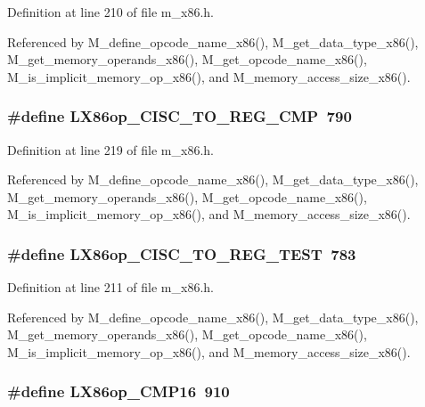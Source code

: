 Definition at line 210 of file m\_\-x86.h.

Referenced by M\_\-define\_\-opcode\_\-name\_\-x86(), M\_\-get\_\-data\_\-type\_\-x86(), M\_\-get\_\-memory\_\-operands\_\-x86(), M\_\-get\_\-opcode\_\-name\_\-x86(), M\_\-is\_\-implicit\_\-memory\_\-op\_\-x86(), and M\_\-memory\_\-access\_\-size\_\-x86().
\subsubsection{\setlength{\rightskip}{0pt plus 5cm}\#define LX86op\_\-CISC\_\-TO\_\-REG\_\-CMP~790}\label{m__x86_8h_5d9566732f64cd5d039d68e9930d2b0f}




Definition at line 219 of file m\_\-x86.h.

Referenced by M\_\-define\_\-opcode\_\-name\_\-x86(), M\_\-get\_\-data\_\-type\_\-x86(), M\_\-get\_\-memory\_\-operands\_\-x86(), M\_\-get\_\-opcode\_\-name\_\-x86(), M\_\-is\_\-implicit\_\-memory\_\-op\_\-x86(), and M\_\-memory\_\-access\_\-size\_\-x86().
\subsubsection{\setlength{\rightskip}{0pt plus 5cm}\#define LX86op\_\-CISC\_\-TO\_\-REG\_\-TEST~783}\label{m__x86_8h_86f3cc381782ce6e9e5ef2978dee282f}




Definition at line 211 of file m\_\-x86.h.

Referenced by M\_\-define\_\-opcode\_\-name\_\-x86(), M\_\-get\_\-data\_\-type\_\-x86(), M\_\-get\_\-memory\_\-operands\_\-x86(), M\_\-get\_\-opcode\_\-name\_\-x86(), M\_\-is\_\-implicit\_\-memory\_\-op\_\-x86(), and M\_\-memory\_\-access\_\-size\_\-x86().
\subsubsection{\setlength{\rightskip}{0pt plus 5cm}\#define LX86op\_\-CMP16~910}\label{m__x86_8h_3081d683bdb8e2ee39cd38b17b8ba489}




